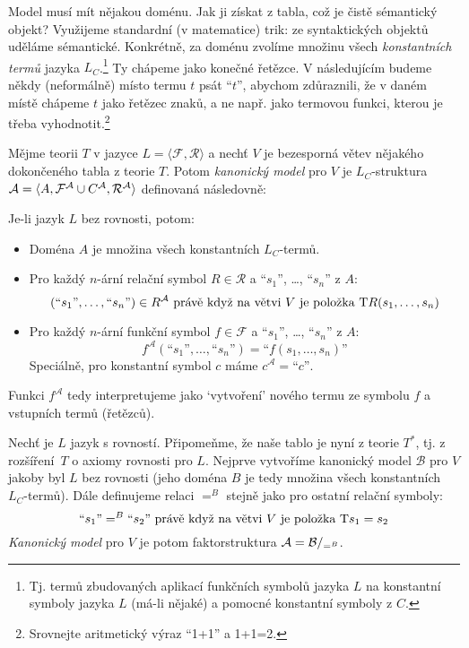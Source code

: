 Model musí mít nějakou doménu. Jak ji získat z tabla, což je čistě sémantický objekt? Využijeme standardní (v matematice) trik: ze syntaktických objektů uděláme sémantické. Konkrétně, za doménu zvolíme množinu všech \emph{konstantních termů} jazyka $L_C$.\footnote{Tj. termů zbudovaných aplikací funkčních symbolů jazyka $L$ na konstantní symboly jazyka $L$ (má-li nějaké) a pomocné konstantní symboly z $C$.} Ty chápeme jako konečné řetězce. V následujícím budeme někdy (neformálně) místo termu $t$ psát ``$t$'', abychom zdůraznili, že v daném místě chápeme $t$ jako řetězec znaků, a ne např. jako termovou funkci, kterou je třeba vyhodnotit.\footnote{Srovnejte aritmetický výraz ``1+1'' a 1+1=2.}

\begin{definition}\label{definition:canonical-model-predicate}
Mějme teorii $T$ v jazyce $L=\langle\mathcal F,\mathcal R\rangle$ a nechť $V$ je bezesporná větev nějakého dokončeného tabla z teorie $T$. Potom \emph{kanonický model} pro $V$ je $L_C$-struktura $\mathcal{A}=\langle A,\mathcal F^\mathcal A\cup C^\mathcal A,\mathcal R^\mathcal A\rangle$ definovaná následovně:

Je-li jazyk $L$ bez rovnosti, potom:
\begin{itemize}
    \item Doména $A$ je množina všech konstantních $L_C$-termů.
    \item Pro každý $n$-ární relační symbol $R\in\mathcal R$ a ``$s_1$'', \dots, ``$s_n$'' z $A$:
    $$
    (\text{``$s_1$''},\dots,\text{``$s_n$''})\in R^\mathcal A\text{ právě když na větvi $V$ je položka $\mathrm{T} R(s_1,\dots,s_n)$}
    $$
    \item Pro každý $n$-ární funkční symbol $f\in\mathcal F$ a ``$s_1$'', \dots, ``$s_n$'' z $A$:
    $$
    f^\mathcal A(\text{``$s_1$''},\dots,\text{``$s_n$''})=\text{``$f(s_1,\dots,s_n)$''}
    $$
    Speciálně, pro konstantní symbol $c$ máme $c^\mathcal A=\text{``$c$''}$.
\end{itemize}
Funkci $f^\mathcal A$ tedy interpretujeme jako `vytvoření' nového termu ze symbolu $f$ a vstupních termů (řetězců). 

Nechť je $L$ jazyk s rovností. Připomeňme, že naše tablo je nyní z teorie $T^*$, tj. z rozšíření~$T$ o axiomy rovnosti pro $L$. Nejprve vytvoříme kanonický model $\mathcal B$ pro $V$ jakoby byl $L$ bez rovnosti (jeho doména $B$ je tedy množina všech konstantních $L_C$-termů). Dále definujeme relaci $=^B$ stejně jako pro ostatní relační symboly:
$$
\text{``$s_1$''}=^B\text{``$s_2$''}\text{ právě když na větvi $V$ je položka $\mathrm{T} s_1=s_2$}
$$
\emph{Kanonický model} pro $V$ je potom faktorstruktura $\mathcal{A}=\mathcal{B}/_{=^B}$.
\end{definition}

